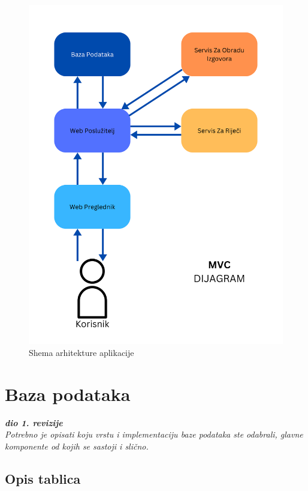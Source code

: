 \begin{figure}[ht]
	\includegraphics[scale=0.1]{dijagrami/Web Preglednik.png} 
	\centering
	\caption{Shema arhitekture aplikacije}
	\label{fig:mvc-arhitektura}
\end{figure}

	
		

		

				
		\section{Baza podataka}
			
			\textbf{\textit{dio 1. revizije}}\\
			
		\textit{Potrebno je opisati koju vrstu i implementaciju baze podataka ste odabrali, glavne komponente od kojih se sastoji i slično.}
		
			\subsection{Opis tablica}
			

